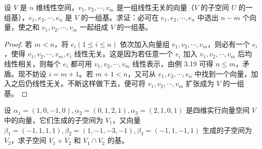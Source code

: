 \documentclass[lang=cn,12pt]{elegantbook}
\begin{document}
\begin{example}
    设 \( V \) 是 \( n \) 维线性空间，\( v_1, v_2, \cdots, v_m \) 是一组线性无关的向量（\( V \) 的子空间 \( U \) 的一组基），\( e_1, e_2, \cdots, e_n \) 是 \( V \) 的一组基。求证：必可在 \( e_1, e_2, \cdots, e_n \) 中选出 \( n - m \) 个向量，使之和 \( v_1, v_2, \cdots, v_m \) 一起组成 \( V \) 的一组基。
\end{example}

\begin{proof}
    若 \( m < n \)，将 \( e_i (1 \leq i \leq n) \) 依次加入向量组 \( v_1, v_2, \cdots, v_m \)，则必有一个 \( e_i \)，使得 \( v_1, v_2, \cdots, v_m, e_i \) 线性无关。这是因为若任意一个 \( e_i \) 加入 \( v_1, v_2, \cdots, v_m \) 后均线性相关，则每个 \( e_i \) 都可用 \( v_1, v_2, \cdots, v_m \) 线性表示，由例 3.19 可得 \( n \leq m \)，矛盾。现不妨设 \( i = m + 1 \)。若 \( m + 1 < n \)，又可从 \( e_1, e_2, \cdots, e_n \) 中找到一个向量，加入之后仍线性无关。不断这样做下去，便可将 \( v_1, v_2, \cdots, v_m \) 扩张成为 \( V \) 的一组基。
\end{proof}

\begin{example}
    设 \(\alpha_1 = (1,0,-1,0), \alpha_2 = (0,1,2,1), \alpha_3 = (2,1,0,1)\) 是四维实行向量空间 \(V\) 中的向量，它们生成的子空间为 \(V_1\)，又向量 \(\beta_1 = (-1,1,1,1), \beta_2 = (1,-1,-3,-1), \beta_3 = (-1,1,-1,1)\) 生成的子空间为 \(V_2\)，求子空间 \(V_1 + V_2\) 和 \(V_1 \cap V_2\) 的基。
\end{example}
    
\end{document}
